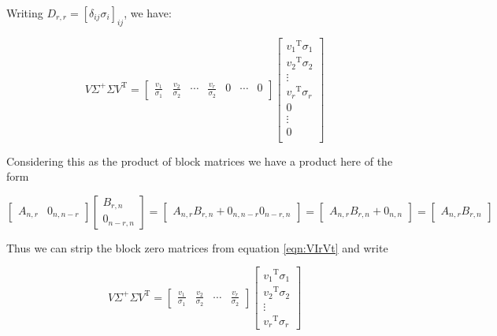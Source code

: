 \documentclass{article}      %
\DeclareMathOperator{\TextTranspose}{T}
\newcommand{\transpose}[1]{{{#1}^{\TextTranspose}}}
\begin{document}
Writing $D_{r,r} = [\delta_{ij}\sigma_i]_{ij}$, we have:

\begin{equation}\label{eqn:VIrVt}
V \Sigma^{+} \Sigma \transpose{V} 
=
\begin{bmatrix}
\frac{v_1}{\sigma_1} & \frac{v_2}{\sigma_2} & \cdots & \frac{v_r}{\sigma_2} & 0 & \cdots & 0 
\end{bmatrix}
\begin{bmatrix}
\transpose{v_1}\sigma_1 \\ \transpose{v_2}\sigma_2 \\ \vdots \\ \transpose{v_r}\sigma_r \\ 0 \\ \vdots \\ 0 \\
\end{bmatrix}
\end{equation}

Considering this as the product of block matrices we have a product here of the form

\[
\begin{bmatrix}
A_{n,r} & 0_{n,n-r}
\end{bmatrix}
\begin{bmatrix}
B_{r,n} \\ 0_{n-r,n}
\end{bmatrix}
=
\begin{bmatrix}
A_{n,r} B_{r,n} + 0_{n,n-r} 0_{n-r,n}
\end{bmatrix}
=
\begin{bmatrix}
A_{n,r} B_{r,n} + 0_{n,n}
\end{bmatrix}
=
\begin{bmatrix}
A_{n,r} B_{r,n}
\end{bmatrix}
\]

Thus we can strip the block zero matrices from equation \ref{eqn:VIrVt} and write

\begin{equation*}
V \Sigma^{+} \Sigma \transpose{V} 
=
\begin{bmatrix}
\frac{v_1}{\sigma_1} & \frac{v_2}{\sigma_2} & \cdots & \frac{v_r}{\sigma_2} 
\end{bmatrix}
\begin{bmatrix}
\transpose{v_1}\sigma_1 \\ \transpose{v_2}\sigma_2 \\ \vdots \\ \transpose{v_r}\sigma_r 
\end{bmatrix}
\end{equation*}
\end{document}
